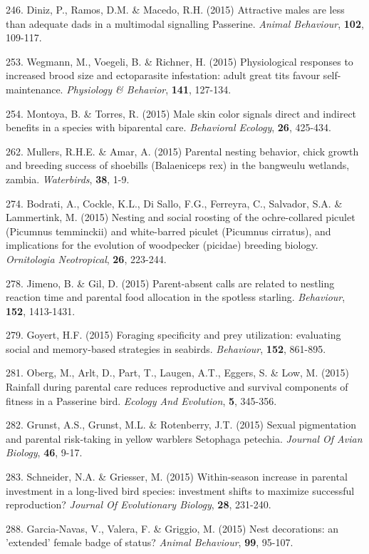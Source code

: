 246. Diniz, P., Ramos, D.M. \&  Macedo, R.H. (2015) Attractive males are less than adequate dads in a multimodal signalling Passerine. \textit{Animal Behaviour},  \textbf{102}, 109-117.

253. Wegmann, M., Voegeli, B. \&  Richner, H. (2015) Physiological responses to increased brood size and ectoparasite infestation: adult great tits favour self-maintenance. \textit{Physiology & Behavior},  \textbf{141}, 127-134.

254. Montoya, B. \&  Torres, R. (2015) Male skin color signals direct and indirect benefits in a species with biparental care. \textit{Behavioral Ecology},  \textbf{26}, 425-434.

262. Mullers, R.H.E. \&  Amar, A. (2015) Parental nesting behavior, chick growth and breeding success of shoebills (Balaeniceps rex) in the bangweulu wetlands, zambia. \textit{Waterbirds},  \textbf{38}, 1-9.

274. Bodrati, A., Cockle, K.L., Di Sallo, F.G., Ferreyra, C., Salvador, S.A. \&  Lammertink, M. (2015) Nesting and social roosting of the ochre-collared piculet (Picumnus temminckii) and white-barred piculet (Picumnus cirratus), and implications for the evolution of woodpecker (picidae) breeding biology. \textit{Ornitologia Neotropical},  \textbf{26}, 223-244.

278. Jimeno, B. \&  Gil, D. (2015) Parent-absent calls are related to nestling reaction time and parental food allocation in the spotless starling. \textit{Behaviour},  \textbf{152}, 1413-1431.

279. Goyert, H.F. (2015) Foraging specificity and prey utilization: evaluating social and memory-based strategies in seabirds. \textit{Behaviour},  \textbf{152}, 861-895.

281. Oberg, M., Arlt, D., Part, T., Laugen, A.T., Eggers, S. \&  Low, M. (2015) Rainfall during parental care reduces reproductive and survival components of fitness in a Passerine bird. \textit{Ecology And Evolution},  \textbf{5}, 345-356.

282. Grunst, A.S., Grunst, M.L. \&  Rotenberry, J.T. (2015) Sexual pigmentation and parental risk-taking in yellow warblers Setophaga petechia. \textit{Journal Of Avian Biology},  \textbf{46}, 9-17.

283. Schneider, N.A. \&  Griesser, M. (2015) Within-season increase in parental investment in a long-lived bird species: investment shifts to maximize successful reproduction? \textit{Journal Of Evolutionary Biology},  \textbf{28}, 231-240.

288. Garcia-Navas, V., Valera, F. \&  Griggio, M. (2015) Nest decorations: an 'extended' female badge of status? \textit{Animal Behaviour},  \textbf{99}, 95-107.

